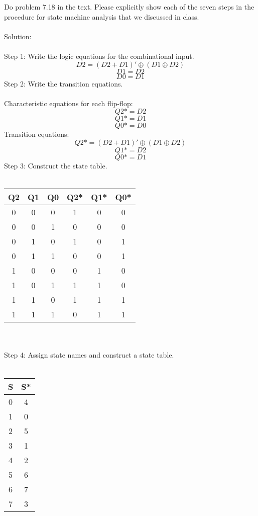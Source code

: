 Do problem 7.18 in the text.  Please explicitly show each of the seven steps in the procedure for state machine analysis that we discussed in class. \\ \\

Solution: \\ \\
Step 1: Write the logic equations for the combinational input.
$$D2 = (D2 + D1)' \oplus (D1 \oplus D2)$$
$$D1 = D2$$
$$D0 = D1$$
Step 2: Write the transition equations. \\ \\
Characteristic equations for each flip-flop:
$$Q2* = D2$$
$$Q1* = D1$$
$$Q0* = D0$$
Transition equations:
$$Q2* = (D2 + D1)' \oplus (D1 \oplus D2)$$
$$Q1* = D2$$
$$Q0* = D1$$
Step 3: Construct the state table. \\ \\
\begin{tabular}{ccc|ccc}
  \textbf{Q2} & \textbf{Q1} & \textbf{Q0} & \textbf{Q2*} & \textbf{Q1*} & \textbf{Q0*} \\
  \hline
  0 & 0 & 0 & 1 & 0 & 0 \\
  0 & 0 & 1 & 0 & 0 & 0 \\
  0 & 1 & 0 & 1 & 0 & 1 \\
  0 & 1 & 1 & 0 & 0 & 1 \\
  1 & 0 & 0 & 0 & 1 & 0 \\
  1 & 0 & 1 & 1 & 1 & 0 \\
  1 & 1 & 0 & 1 & 1 & 1 \\
  1 & 1 & 1 & 0 & 1 & 1 \\
\end{tabular} \\ \\
Step 4: Assign state names and construct a state table. \\ \\
\begin{tabular}{c|c}
  \textbf{S} & \textbf{S*} \\
  \hline
  0 & 4 \\
  1 & 0 \\
  2 & 5 \\
  3 & 1 \\
  4 & 2 \\
  5 & 6 \\
  6 & 7 \\
  7 & 3 \\
\end{tabular} \\ \\
